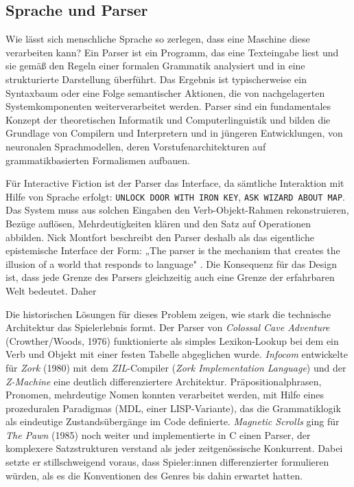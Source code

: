 \documentclass[parskip=half,a4paper,11pt]{scrreprt}
\begin{document}
\subsection{Sprache und Parser}

Wie lässt sich menschliche Sprache so zerlegen, dass eine Maschine diese verarbeiten kann? Ein Parser ist ein Programm, das eine Texteingabe liest und sie gemäß den Regeln einer formalen Grammatik analysiert und in eine strukturierte Darstellung überführt. Das Ergebnis ist typischerweise ein Syntaxbaum oder eine Folge semantischer Aktionen, die von nachgelagerten Systemkomponenten weiterverarbeitet werden. Parser sind ein fundamentales Konzept der theoretischen Informatik und Computerlinguistik und bilden die Grundlage von Compilern und Interpretern und in jüngeren Entwicklungen, von neuronalen Sprachmodellen, deren Vorstufenarchitekturen auf grammatikbasierten Formalismen aufbauen.

Für Interactive Fiction ist der Parser das Interface, da sämtliche Interaktion mit Hilfe von Sprache erfolgt: \texttt{UNLOCK DOOR WITH IRON KEY}, \texttt{ASK WIZARD ABOUT MAP}. Das System muss aus solchen Eingaben den Verb-Objekt-Rahmen rekonstruieren, Bezüge auflösen, Mehrdeutigkeiten klären und den Satz auf Operationen abbilden. Nick Montfort beschreibt den Parser deshalb als das eigentliche epistemische Interface der Form: „The parser is the mechanism that creates the illusion of a world that responds to language" \citep{Montfort2003}. Die Konsequenz für das Design ist, dass jede Grenze des Parsers gleichzeitig auch eine Grenze der erfahrbaren Welt bedeutet. Daher 

Die historischen Lösungen für dieses Problem zeigen, wie stark die technische Architektur das Spielerlebnis formt. Der Parser von \textit{Colossal Cave Adventure} (Crowther/Woods, 1976) funktionierte als simples Lexikon-Lookup bei dem ein Verb und Objekt mit einer festen Tabelle abgeglichen wurde. \textit{Infocom} entwickelte für \textit{Zork} (1980) mit dem \textit{ZIL}-Compiler (\textit{Zork Implementation Language}) und der \textit{Z-Machine} eine deutlich differenziertere Architektur. Präpositionalphrasen, Pronomen, mehrdeutige Nomen konnten verarbeitet werden, mit Hilfe eines prozeduralen Paradigmas (MDL, einer LISP-Variante), das die Grammatiklogik als eindeutige Zustandsübergänge im Code definierte. \textit{Magnetic Scrolls} ging für \textit{The Pawn} (1985) noch weiter und implementierte in C einen Parser, der komplexere Satzstrukturen verstand als jeder zeitgenössische Konkurrent. Dabei setzte er stillschweigend voraus, dass Spieler:innen differenzierter formulieren würden, als es die Konventionen des Genres bis dahin erwartet hatten.
\end{document}
